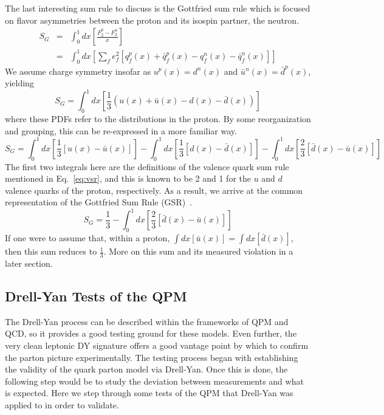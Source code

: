 The last interesting sum rule to discuss is the Gottfried sum rule which is focused on flavor asymmetries between the proton and its isospin partner, the neutron.
\begin{eqnarray}
  S_G & = & \int_0^1 dx \left[\frac{F_2^p - F_2^n}{x}\right] \\
  & = & \int_0^1 dx \left[ \sum\limits_f e_f^2 [q_f^p(x) + \bar{q}_f^p(x) - q_f^n(x) - \bar{q}_f^n(x)] \right]
\end{eqnarray}
We assume charge symmetry insofar as $u^p(x) = d^n(x)$ and $\bar{u}^n (x) = \bar{d}^p(x)$, yielding
\begin{equation}
S_G = \int_0^1 dx \left[ \frac{1}{3} (u(x) + \bar{u}(x) - d(x) - \bar{d}(x)) \right]
\end{equation}
where these PDFs refer to the distributions in the proton. By some reorganization and grouping, this can be re-expressed in a more familiar way.
\begin{equation}
S_G = \int_0^1 dx \left[\frac{1}{3} [u(x) - \bar{u}(x)] \right] - 
      \int_0^1 dx \left[\frac{1}{3} [d(x) - \bar{d}(x)] \right] -
      \int_0^1 dx \left[\frac{2}{3} [\bar{d}(x) - \bar{u}(x)] \right]
\end{equation}
The first two integrals here are the definitions of the valence quark sum rule mentioned in Eq.~\ref{eq:vsr}, and this is known to be 2 and 1 for the $u$ and $d$ valence quarks of the proton, respectively. As a result, we arrive at the common representation of the Gottfried Sum Rule (GSR)~\cite{Gottfried:1967kk}.
\begin{equation}
	  S_G = \frac{1}{3} - \int_0^1 dx \left[ \frac{2}{3} [\bar{d}(x) - \bar{u}(x)] \right]
      \label{eq:gsr}
\end{equation}
If one were to assume that, within a proton, $\int dx [\bar{u}(x)] = \int dx[\bar{d}(x)]$, then this sum reduces to $\frac{1}{3}$. More on this sum and its measured violation in a later section.

\subsection{Drell-Yan Tests of the QPM}

The Drell-Yan process can be described within the frameworks of QPM and QCD, so it provides a good testing ground for these models. Even further, the very clean leptonic DY signature offers a good vantage point by which to confirm the parton picture experimentally. The testing process began with establishing the validity of the quark parton model via Drell-Yan. Once this is done, the following step would be to study the deviation between measurements and what is expected. Here we step through some tests of the QPM that Drell-Yan was applied to in order to validate.

